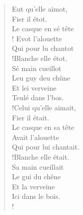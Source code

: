 \documentclass[french,twoside]{book} %
\begin{document}
\begin{verse}
Eut qu’elle aimot,\\
Fier il étot.\\
Le casque en sé tête\\! Evot l’alouette\\
Qui pour lu chantot\\!Blanche elle étot.\\
Sé main cueillot\\
Leu guy deu chûne\\
Et lei verveine\\
Teulé dans l’bos.\\!Celui qu’elle aimait,\\
Fier il était.\\
Le casque en sa tête\\
Avait l’alouette\\
Qui pour lui chantait.\\!Blanche elle était.\\
Sa main cueillait\\
Le gui du chêne\\
Et la verveine\\
Ici dans le bois.\\!
\end{verse}
\end{document}
